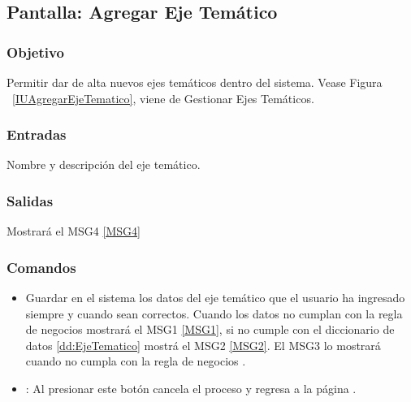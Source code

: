 \subsection{Pantalla: Agregar Eje Temático}

\subsubsection{Objetivo}
Permitir dar de alta nuevos ejes temáticos dentro del sistema.  Vease Figura ~\ref{IUAgregarEjeTematico}, viene de Gestionar Ejes Temáticos.



\subsubsection{Entradas}
Nombre y descripción del eje temático.

\subsubsection{Salidas}
Mostrará el MSG4 \ref{MSG4}

\subsubsection{Comandos}
\begin{itemize}
 \item {} Guardar en el sistema los datos del eje temático que el usuario ha ingresado siempre y cuando sean correctos. Cuando los datos no  cumplan con la regla de negocios    mostrará el MSG1 \ref{MSG1}, si no cumple con el diccionario de datos \ref{dd:EjeTematico} mostrá el MSG2 \ref{MSG2}. El MSG3 lo mostrará cuando no cumpla con la regla de negocios . 
 \item {}: Al presionar este botón cancela el proceso y regresa a la página .

\end{itemize}



